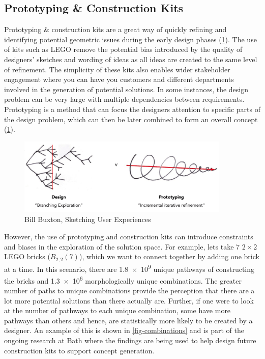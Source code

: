 \subsection{Prototyping \& Construction Kits}

Prototyping \& construction kits are a great way of quickly refining and identifying potential geometric issues during the early design phases (\cref{fig-why-prototype}). The use of kits such as LEGO\texttrademark{} remove the potential bias introduced by the quality of designers' sketches and wording of ideas as all ideas are created to the same level of refinement. The simplicity of these kits also enables wider stakeholder engagement where you can have you customers and different departments involved in the generation of potential solutions. In some instances, the design problem can be very large with multiple dependencies between requirements. Prototyping is a method that can focus the designers attention to specific parts of the design problem, which can then be later combined to form an overall concept (\cref{fig-why-prototype}).

\begin{figure}[h!]
    \centering
    \includegraphics[width=0.9\textwidth]{05_concept_generation/whyprototype.png}
    \caption[Bill Buxton, Sketching User Experiences]{Bill Buxton, Sketching User Experiences~\citep{buxton2010}}
    \label{fig-why-prototype}
\end{figure}

However, the use of prototyping and construction kits can introduce constraints and biases in the exploration of the solution space. 
For example, lets take 7 $2\times2$ LEGO\texttrademark{} bricks ($B_{2,2}(7)$), which we want to connect together by adding one brick at a time. In this scenario, there are \num{1.8e9} unique pathways of constructing the bricks and \num{1.3e6} morphologically unique combinations. The greater number of paths to unique combinations provide the perception that there are a lot more potential solutions than there actually are. Further, if one were to look at the number of pathways to each unique combination, some have more pathways than others and hence, are statistically more likely to be created by a designer. An example of this is shown in \cref{fig-combinations} and is part of the ongoing research at Bath where the findings are being used to help design future construction kits to support concept generation\cite{design2018}.

